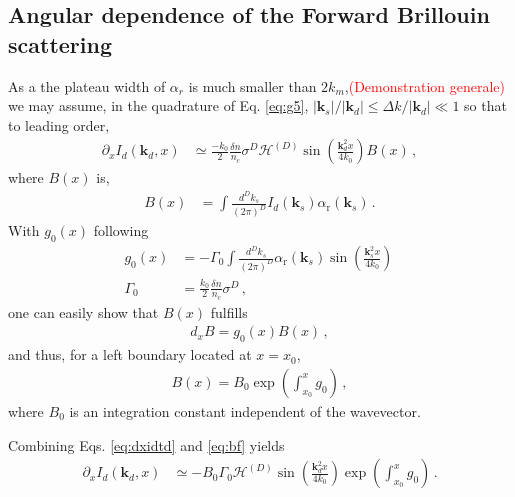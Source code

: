 \documentclass[
 reprint,
 amsmath,amssymb,
 aps,
]{revtex4-1}
\begin{document}
 \subsection{Angular dependence of the  Forward Brillouin scattering}
As a the plateau width of $\alpha_r$ is much smaller than $2k_m$,\textcolor{red}{(Demonstration generale)}  we may assume, in the quadrature of Eq. \eqref{eq:g5},   $ \vert\mathbf{k}_s \vert/\vert\mathbf{k}_d\vert \le\Delta k/ \vert\mathbf{k}_d\vert \ll 1$ so that to leading order,
\begin{align}
\partial_xI_d(\mathbf{k}_d,x)&\simeq  \frac{-k_0}{2} \frac{ \delta n}{n_c}   \sigma^D 
 \mathcal{H}^{(D)}\sin\left({\frac{ \mathbf{k}_d^2x}{4k_0}}  \right)
B(x)
\, , \label{eq:dxidtd}
\end{align}
where $B(x)$ is,
\begin{align}
B(x)&=
 \int \frac{d^Dk_s}{(2\pi)^D}    I_d(\mathbf{k}_s) \alpha_\mathrm{r}(\mathbf{k}_s) 
\, . \label{eq:b}
\end{align}
With $g_0(x)$ following
\begin{align}
g_0(x)&= -\Gamma_0 \int \frac{d^Dk_s}{(2\pi)^D}  \alpha_\mathrm{r}(\mathbf{k}_s) 
\sin\left(\frac{ \mathbf{k}_s^2x}{4k_0}  \right)\,  \nonumber\\
\Gamma_0&=\frac{k_0}{2}  \frac{\delta n}{n_c}
  \sigma^D \, ,
\label{eq:gain0}
\end{align}
one can easily show that $B(x)$ fulfills 
\begin{align}
d_xB = g_0(x) B(x)\, ,
\label{eq:db}
\end{align} 
and thus, for a left boundary located at $x=x_0$,
\begin{align}
B(x) = B_0\exp\left(\int_{x_0}^x g_0 \right)\, ,
\label{eq:bf}
\end{align} 
where $B_0$ is an integration constant independent of the wavevector.

Combining Eqs.  \eqref{eq:dxidtd} and \eqref{eq:bf} yields 
\begin{align}
\partial_xI_d(\mathbf{k}_d,x)&\simeq -B_0\Gamma_0
 \mathcal{H}^{(D)}\sin\left({\frac{ \mathbf{k}_d^2x}{4k_0}}  \right)
\exp\left(\int_{x_0}^x g_0 \right)
\, . \label{eq:dxidtdf}
\end{align}
\end{document}

